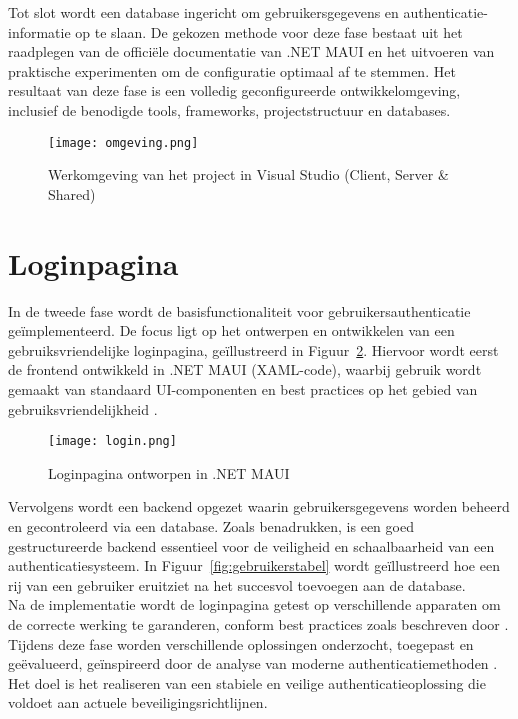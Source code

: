 Tot slot wordt een database ingericht om gebruikersgegevens en authenticatie-informatie op te slaan. De gekozen methode voor deze fase bestaat uit het raadplegen van de officiële documentatie van .NET MAUI en het uitvoeren van praktische experimenten om de configuratie optimaal af te stemmen. Het resultaat van deze fase is een volledig geconfigureerde ontwikkelomgeving, inclusief de benodigde tools, frameworks, projectstructuur en databases.\\

\begin{figure}[H]
    \centering
    \texttt{[image: omgeving.png]}
    \caption{Werkomgeving van het project in Visual Studio (Client, Server & Shared)}
    \label{fig:omgeving}
\end{figure}

\section{Loginpagina}

In de tweede fase wordt de basisfunctionaliteit voor gebruikersauthenticatie geïmplementeerd. De focus ligt op het ontwerpen en ontwikkelen van een gebruiksvriendelijke loginpagina, geïllustreerd in Figuur~\ref{fig:loginpagina}. Hiervoor wordt eerst de frontend ontwikkeld in .NET MAUI (XAML-code), waarbij gebruik wordt gemaakt van standaard UI-componenten en best practices op het gebied van gebruiksvriendelijkheid \autocite{Chinnasamy2025}. \\

\begin{figure}[H]
	\centering
	\texttt{[image: login.png]}
	\caption{Loginpagina ontworpen in .NET MAUI}
	\label{fig:loginpagina}
\end{figure}

Vervolgens wordt een backend opgezet waarin gebruikersgegevens worden beheerd en gecontroleerd via een database. Zoals \textcite{Gupta2022} benadrukken, is een goed gestructureerde backend essentieel voor de veiligheid en schaalbaarheid van een authenticatiesysteem. In Figuur~\ref{fig:gebruikerstabel} wordt geïllustreerd hoe een rij van een gebruiker eruitziet na het succesvol toevoegen aan de database. \\

Na de implementatie wordt de loginpagina getest op verschillende apparaten om de correcte werking te garanderen, conform best practices zoals beschreven door \textcite{Chinnasamy2025}. Tijdens deze fase worden verschillende oplossingen onderzocht, toegepast en geëvalueerd, geïnspireerd door de analyse van moderne authenticatiemethoden \autocite{Gao2023}. Het doel is het realiseren van een stabiele en veilige authenticatieoplossing die voldoet aan actuele beveiligingsrichtlijnen. \\

